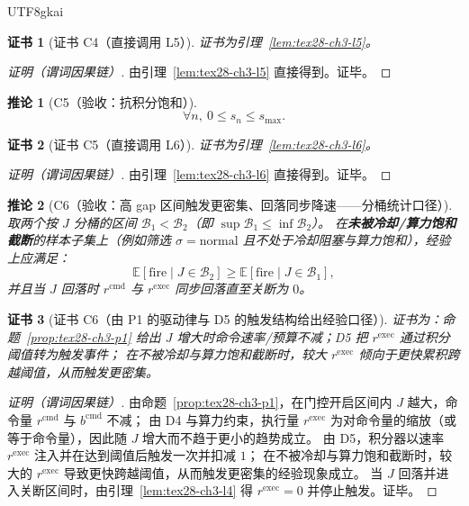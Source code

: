 \documentclass[12pt]{article}
\newtheorem{corollary}{推论}[section]
\newtheorem{Certificate}{证书}[section]
\begin{document}
\begin{CJK*}{UTF8}{gkai}
\begin{Certificate}[证书 C4（直接调用 L5）]
\label{cert:tex28-ch3-c4}
证书为引理~\ref{lem:tex28-ch3-l5}。
\end{Certificate}

\begin{proof}[证明（谓词因果链）]
由引理~\ref{lem:tex28-ch3-l5} 直接得到。证毕。
\end{proof}

\begin{corollary}[C5（验收：抗积分饱和）]
\label{cor:tex28-ch3-c5}
\[
  \forall n,\ 0\le s_n\le s_{\max}.
\]
\end{corollary}

\begin{Certificate}[证书 C5（直接调用 L6）]
\label{cert:tex28-ch3-c5}
证书为引理~\ref{lem:tex28-ch3-l6}。
\end{Certificate}

\begin{proof}[证明（谓词因果链）]
由引理~\ref{lem:tex28-ch3-l6} 直接得到。证毕。
\end{proof}

\begin{corollary}[C6（验收：高 gap 区间触发更密集、回落同步降速——分桶统计口径）]
\label{cor:tex28-ch3-c6}
取两个按 $J$ 分桶的区间 $\mathcal{B}_1<\mathcal{B}_2$（即 $\sup\mathcal{B}_1\le\inf\mathcal{B}_2$）。
在\textbf{未被冷却/算力饱和截断}的样本子集上（例如筛选 $\sigma=\mathrm{normal}$ 且不处于冷却阻塞与算力饱和），经验上应满足：
\[
  \mathbb{E}[\mathrm{fire}\mid J\in\mathcal{B}_2]\ge \mathbb{E}[\mathrm{fire}\mid J\in\mathcal{B}_1],
\]
并且当 $J$ 回落时 $r^{\mathrm{cmd}}$ 与 $r^{\mathrm{exec}}$ 同步回落直至关断为 $0$。
\end{corollary}

\begin{Certificate}[证书 C6（由 P1 的驱动律与 D5 的触发结构给出经验口径）]
\label{cert:tex28-ch3-c6}
证书为：命题~\ref{prop:tex28-ch3-p1} 给出 $J$ 增大时命令速率/预算不减；D5 把 $r^{\mathrm{exec}}$ 通过积分阈值转为触发事件；
在不被冷却与算力饱和截断时，较大 $r^{\mathrm{exec}}$ 倾向于更快累积跨越阈值，从而触发更密集。
\end{Certificate}

\begin{proof}[证明（谓词因果链）]
由命题~\ref{prop:tex28-ch3-p1}，在门控开启区间内 $J$ 越大，命令量 $r^{\mathrm{cmd}}$ 与 $b^{\mathrm{cmd}}$ 不减；
由 D4 与算力约束，执行量 $r^{\mathrm{exec}}$ 为对命令量的缩放（或等于命令量），因此随 $J$ 增大而不趋于更小的趋势成立。
由 D5，积分器以速率 $r^{\mathrm{exec}}$ 注入并在达到阈值后触发一次并扣减 $1$；
在不被冷却与算力饱和截断时，较大的 $r^{\mathrm{exec}}$ 导致更快跨越阈值，从而触发更密集的经验现象成立。
当 $J$ 回落并进入关断区间时，由引理~\ref{lem:tex28-ch3-l4} 得 $r^{\mathrm{exec}}=0$ 并停止触发。证毕。
\end{proof}


\end{CJK*}
\end{document}
